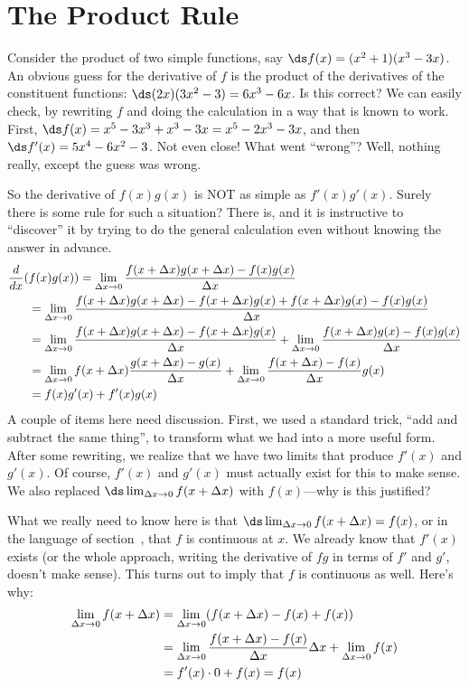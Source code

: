 \section{The Product Rule}{}{}

Consider the product of two simple functions, say
$\ds f(x)=(x^2+1)(x^3-3x)$. An obvious guess for the derivative of $f$ is
the product of the derivatives of the constituent functions:
$\ds (2x)(3x^2-3)=6x^3-6x$. Is this correct? We can easily check, by
rewriting $f$ and doing the calculation in a way that is known to
work. First, $\ds f(x)=x^5-3x^3+x^3-3x=x^5-2x^3-3x$, and then
$\ds f'(x)=5x^4-6x^2-3$. Not even close! What went ``wrong''? Well,
nothing really, except the guess was wrong. 

So the derivative of $f(x)g(x)$ is NOT as simple as
$f'(x)g'(x)$. Surely there is some rule for such a situation? There
is, and it is instructive to ``discover'' it by trying to do the
general calculation even without knowing the answer in advance.
\begin{align*}
{d\over dx}(&f(x)g(x)) = \lim_{\Delta x \to0} {f(x+\Delta
  x)g(x+\Delta x) - f(x)g(x)\over \Delta x} \\
&=\lim_{\Delta x \to0} {f(x+\Delta
  x)g(x+\Delta x)-f(x+\Delta x)g(x) + f(x+\Delta x)g(x)- f(x)g(x)\over
  \Delta x} \\ 
&=\lim_{\Delta x \to0} {f(x+\Delta
  x)g(x+\Delta x)-f(x+\Delta x)g(x)\over \Delta x} + 
\lim_{\Delta x \to0} {f(x+\Delta x)g(x)- f(x)g(x)\over
  \Delta x} \\ 
&=\lim_{\Delta x \to0} f(x+\Delta x){
 g(x+\Delta x)-g(x)\over \Delta x} + 
\lim_{\Delta x \to0} {f(x+\Delta x)- f(x)\over
  \Delta x}g(x) \\ 
&=f(x)g'(x) + f'(x)g(x) \\
\end{align*}
A couple of items here need discussion. First, we used a standard
trick, ``add and subtract the same thing'', to transform what we had
into a more useful form. After some rewriting, we realize that we have
two limits that produce $f'(x)$ and $g'(x)$. Of course, $f'(x)$ and
$g'(x)$ must actually exist for this to make sense.
We also replaced
$\ds \lim_{\Delta x\to0}f(x+\Delta x)$ with $f(x)$---why is this justified? 

What we really need to know here is that $\ds \lim_{\Delta x\to
  0}f(x+\Delta x)=f(x)$, or in the language of
section~, that $f$ is continuous
at $x$.  We already know that $f'(x)$ exists (or the whole approach,
writing the derivative of $fg$ in terms of $f'$ and $g'$, doesn't make
sense). This turns out to imply that $f$ is continuous as well. Here's
why:
\begin{align*}
\lim_{\Delta x\to 0} f(x+\Delta x) &= \lim_{\Delta x\to 0} (f(x+\Delta
x) -f(x) + f(x)) \\
&= \lim_{\Delta x\to 0} {f(x+\Delta x) -f(x)\over \Delta x}\Delta x +
\lim_{\Delta x\to 0} f(x) \\
&=f'(x)\cdot 0 + f(x) = f(x) \\
\end{align*}

